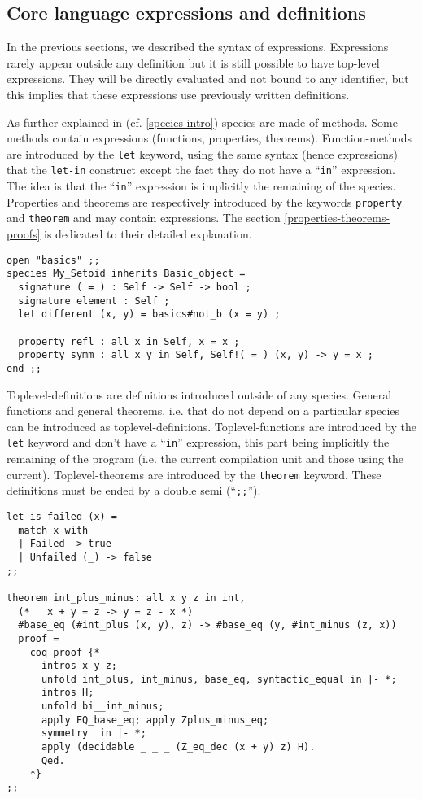 \subsection{Core language expressions and definitions}
In the previous sections, we described the syntax of
expressions. Expressions rarely appear outside any
definition but it is still possible to have top-level
expressions. They  will be directly evaluated and not bound to any
identifier, but this implies that these expressions use previously
written definitions.

\medskip
As further explained  in (cf. \ref{species-intro}) species are made
of methods. Some methods contain expressions (functions, properties,
theorems). Function-methods are introduced by the {\tt let} keyword,
using the same syntax (hence expressions) that the {\tt let-in}
construct except the fact they do not have a ``{\tt in}'' expression.
The idea is that the ``{\tt in}'' expression is implicitly the
remaining of the species. Properties and theorems are respectively
introduced by the keywords {\tt property} and {\tt theorem} and may
 contain expressions. The  section
\ref{properties-theorems-proofs}  is dedicated to their detailed explanation.

{\scriptsize
\begin{lstlisting}
open "basics" ;;
species My_Setoid inherits Basic_object =
  signature ( = ) : Self -> Self -> bool ;
  signature element : Self ;
  let different (x, y) = basics#not_b (x = y) ;

  property refl : all x in Self, x = x ;
  property symm : all x y in Self, Self!( = ) (x, y) -> y = x ;
end ;;
\end{lstlisting}}


\medskip

Toplevel-definitions are definitions introduced outside of any
species. General functions and general theorems, i.e. that do not
depend on a particular species can be introduced as
toplevel-definitions. Toplevel-functions are introduced by the {\tt
  let} keyword and don't have a ``{\tt in}'' expression, this part
being implicitly the remaining of the program (i.e. the current
compilation unit and those using the current).  Toplevel-theorems are
introduced by the {\tt theorem} keyword. These definitions must be
ended by a double semi (``{\tt ;;}'').

{\scriptsize
\begin{lstlisting}
let is_failed (x) =
  match x with
  | Failed -> true
  | Unfailed (_) -> false
;;

theorem int_plus_minus: all x y z in int,
  (*   x + y = z -> y = z - x *)
  #base_eq (#int_plus (x, y), z) -> #base_eq (y, #int_minus (z, x))
  proof =
    coq proof {*
      intros x y z;
      unfold int_plus, int_minus, base_eq, syntactic_equal in |- *;
      intros H;
      unfold bi__int_minus;
      apply EQ_base_eq; apply Zplus_minus_eq;
      symmetry  in |- *;
      apply (decidable _ _ _ (Z_eq_dec (x + y) z) H).
      Qed.
    *}
;;
\end{lstlisting}}



